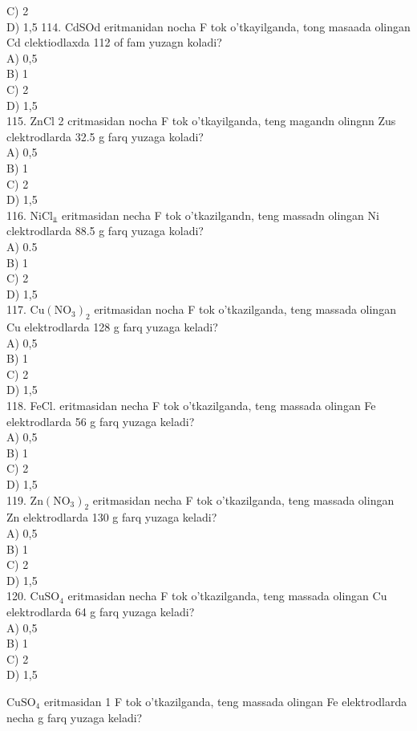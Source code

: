 C) 2\\
D) 1,5
114. CdSOd eritmanidan nocha F tok o'tkayilganda, tong masaada olingan Cd clektiodlaxda 112 of fam yuzagn koladi?\\
A) 0,5\\
B) 1\\
C) 2\\
D) 1,5\\
115. ZnCl 2 critmasidan nocha F tok o'tkayilganda, teng magandn olingnn Zus clektrodlarda 32.5 g farq yuzaga koladi?\\
A) 0,5\\
B) 1\\
C) 2\\
D) 1,5\\
116. $\mathrm{NiCl}_{\Perp}$ eritmasidan necha F tok o'tkazilgandn, teng massadn olingan Ni clektrodlarda 88.5 g farq yuzaga koladi?\\
A) 0.5\\
B) 1\\
C) 2\\
D) 1,5\\
117. $\mathrm{Cu}\left(\mathrm{NO}_{3}\right)_{2}$ eritmasidan nocha F tok o'tkazilganda, teng massada olingan Cu elektrodlarda 128 g farq yuzaga keladi?\\
A) 0,5\\
B) 1\\
C) 2\\
D) 1,5\\
118. FeCl. eritmasidan necha F tok o'tkazilganda, teng massada olingan Fe elektrodlarda 56 g farq yuzaga keladi?\\
A) 0,5\\
B) 1\\
C) 2\\
D) 1,5\\
119. $\mathrm{Zn}\left(\mathrm{NO}_{3}\right)_{2}$ eritmasidan necha F tok o'tkazilganda, teng massada olingan Zn elektrodlarda 130 g farq yuzaga keladi?\\
A) 0,5\\
B) 1\\
C) 2\\
D) 1,5\\
120. $\mathrm{CuSO}_{4}$ eritmasidan necha F tok o'tkazilganda, teng massada olingan Cu elektrodlarda 64 g farq yuzaga keladi?\\
A) 0,5\\
B) 1\\
C) 2\\
D) 1,5
  \item $\mathrm{CuSO}_{4}$ eritmasidan 1 F tok o'tkazilganda, teng massada olingan Fe elektrodlarda necha g farq yuzaga keladi?\\
